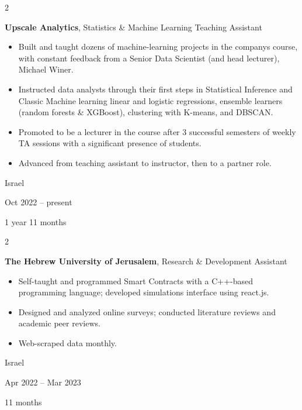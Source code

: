 \documentclass[10pt, letterpaper]{article}
\newenvironment{highlights}{
    \begin{itemize}[
        topsep=0.10 cm,
        parsep=0.10 cm,
        partopsep=0pt,
        itemsep=0pt,
        leftmargin=0.4 cm + 10pt
    ]
}{
    \end{itemize}
} %
\newenvironment{twocolentry}[2][]{
    \onecolentry
    \def\secondColumn{#2}
    \setcolumnwidth{\fill, 4.5 cm}
    \begin{paracol}{2}
}{
    \switchcolumn \raggedleft \secondColumn
    \end{paracol}
    \endonecolentry
} %
\begin{document}
        \begin{twocolentry}{
            Israel

        Oct 2022 – present

        1 year 11 months
        }
            \textbf{Upscale Analytics}, Statistics \& Machine Learning Teaching Assistant
            \begin{highlights}
                \item Built and taught dozens of machine-learning projects in the companys course, with constant feedback from a Senior Data Scientist (and head lecturer), Michael Winer.
                \item Instructed data analysts through their first steps in Statistical Inference and Classic Machine learning linear and logistic regressions, ensemble learners (random forests \& XGBoost), clustering with K-means, and DBSCAN.
                \item Promoted to be a lecturer in the course after 3 successful semesters of weekly TA sessions with a significant presence of students.
                \item Advanced from teaching assistant to instructor, then to a partner role.
            \end{highlights}
        \end{twocolentry}


        \vspace{0.2 cm}

        \begin{twocolentry}{
            Israel

        Apr 2022 – Mar 2023

        11 months
        }
            \textbf{The Hebrew University of Jerusalem}, Research \& Development Assistant
            \begin{highlights}
                \item Self-taught and programmed Smart Contracts with a C++-based programming language; developed simulations interface using react.js.
                \item Designed and analyzed online surveys; conducted literature reviews and academic peer reviews.
                \item Web-scraped data monthly.
            \end{highlights}
        \end{twocolentry}


        \vspace{0.2 cm}
\end{document}
